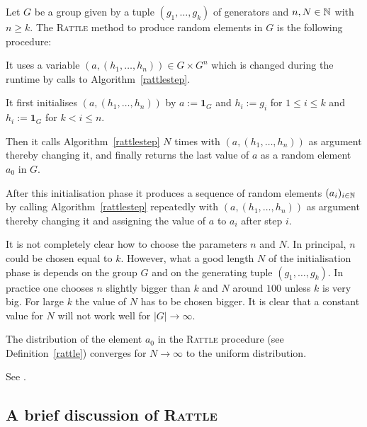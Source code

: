 \begin{Def}
    \label{rattle}
Let $G$ be a group given by a tuple $(g_1, \ldots, g_k)$ of generators
and $n, N \in \mathbb{N}$ with $n \ge k$. The \textsc{Rattle} method to
produce random elements in $G$ is the following procedure:

It uses a variable $(a,(h_1,\ldots,h_n)) \in G \times G^n$
which is changed during the runtime by calls to
Algorithm~\ref{rattlestep}.

It first initialises $(a,(h_1,\ldots,h_n))$
by $a := \mathbf{1}_G$ and $h_i := g_i$ for $1 \le i \le k$ and $h_i
:= \mathbf{1}_G$ for $k < i \le n$.

Then it calls Algorithm~\ref{rattlestep} $N$
times with $(a,(h_1, \ldots, h_n))$ as argument
thereby changing it, and
finally returns the last value of $a$ as a random element $a_0$ in $G$.

After this initialisation phase it produces a sequence of random
elements $(a_i)_{i \in \mathbb{N}}$ by calling 
Algorithm~\ref{rattlestep} repeatedly with 
$(a,(h_1, \ldots, h_n))$ as argument thereby changing it and
assigning the value of $a$ to $a_i$ after step $i$.
\end{Def}

\begin{Rem}
It is not completely clear how to choose the parameters $n$ and $N$. In
principal, $n$ could be chosen equal to $k$. However, what a good length
$N$ of the initialisation phase is depends on the group $G$ and
on the generating tuple $(g_1, \ldots, g_k)$. In practice one chooses $n$
slightly bigger than $k$ and $N$ around $100$ unless $k$ is very big.
For large $k$ the value of $N$ has to be chosen bigger. It is clear
that a constant value for $N$ will not work well for $|G| \to \infty$.
\end{Rem}

\begin{Prop}
    \label{proprattle}
    The distribution of the element $a_0$ in the \textsc{Rattle} procedure (see
    Definition~\ref{rattle}) converges for $N \to \infty$ to the
    uniform distribution.
\end{Prop}
\proofbeg
See \cite[Section~4]{LGMurray}.
\proofend

\subsection{A brief discussion of \textsc{Rattle}}

